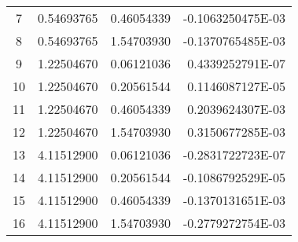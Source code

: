\begin{longtable}{@{\extracolsep{\fill}}cllr@{}}
7  &  0.54693765  &  0.46054339  &  -0.1063250475E-03 \\

8  &  0.54693765  &  1.54703930  &  -0.1370765485E-03 \\

9  &  1.22504670  &  0.06121036  &   0.4339252791E-07 \\

10  &  1.22504670  &  0.20561544  &   0.1146087127E-05 \\

11  &  1.22504670  &  0.46054339  &   0.2039624307E-03 \\

12  &  1.22504670  &  1.54703930  &   0.3150677285E-03 \\

13  &  4.11512900  &  0.06121036  &  -0.2831722723E-07 \\

14  &  4.11512900  &  0.20561544  &  -0.1086792529E-05 \\

15  &  4.11512900  &  0.46054339  &  -0.1370131651E-03 \\

16  &  4.11512900  &  1.54703930  &  -0.2779272754E-03 \\
\end{longtable}